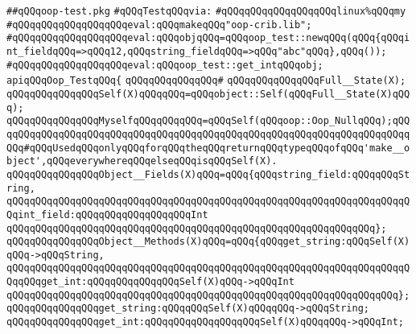 \label{src/app/tut/oop-crib/oop-crib.pkg}
\verb|##qQQqoop-test.pkg|\newline
\newline
\verb|#qQQqTestqQQqvia:|\newline
\verb|#qQQqqQQqqQQqqQQqqQQqlinux%qQQqmy|\newline
\verb|#qQQqqQQqqQQqqQQqqQQqeval:qQQqmakeqQQq"oop-crib.lib";|\newline
\verb|#qQQqqQQqqQQqqQQqqQQqeval:qQQqobjqQQq=qQQqoop_test::newqQQq(qQQq{qQQqint_fieldqQQq=>qQQq12,qQQqstring_fieldqQQq=>qQQq"abc"qQQq},qQQq());|\newline
\verb|#qQQqqQQqqQQqqQQqqQQqeval:qQQqoop_test::get_intqQQqobj;|\newline
\newline
\verb|apiqQQqOop_TestqQQq{|\newline
\verb|qQQqqQQqqQQqqQQq#|\newline
\verb|qQQqqQQqqQQqqQQqFull__State(X);|\newline
\verb|qQQqqQQqqQQqqQQqSelf(X)qQQqqQQq=qQQqobject::Self(qQQqFull__State(X)qQQq);|\newline
\verb|qQQqqQQqqQQqqQQqMyselfqQQqqQQqqQQq=qQQqSelf(qQQqoop::Oop_NullqQQq);qQQqqQQqqQQqqQQqqQQqqQQqqQQqqQQqqQQqqQQqqQQqqQQqqQQqqQQqqQQqqQQqqQQqqQQqqQQq#qQQqUsedqQQqonlyqQQqforqQQqtheqQQqreturnqQQqtypeqQQqofqQQq'make__object',qQQqeverywhereqQQqelseqQQqisqQQqSelf(X).|\newline
\newline
\verb|qQQqqQQqqQQqqQQqObject__Fields(X)qQQq=qQQq{qQQqstring_field:qQQqqQQqString,|\newline
\verb|qQQqqQQqqQQqqQQqqQQqqQQqqQQqqQQqqQQqqQQqqQQqqQQqqQQqqQQqqQQqqQQqqQQqqQQqint_field:qQQqqQQqqQQqqQQqqQQqInt|\newline
\verb|qQQqqQQqqQQqqQQqqQQqqQQqqQQqqQQqqQQqqQQqqQQqqQQqqQQqqQQqqQQqqQQq};|\newline
\newline
\verb|qQQqqQQqqQQqqQQqObject__Methods(X)qQQq=qQQq{qQQqget_string:qQQqSelf(X)qQQq->qQQqString,|\newline
\verb|qQQqqQQqqQQqqQQqqQQqqQQqqQQqqQQqqQQqqQQqqQQqqQQqqQQqqQQqqQQqqQQqqQQqqQQqqQQqget_int:qQQqqQQqqQQqqQQqSelf(X)qQQq->qQQqInt|\newline
\verb|qQQqqQQqqQQqqQQqqQQqqQQqqQQqqQQqqQQqqQQqqQQqqQQqqQQqqQQqqQQqqQQqqQQq};|\newline
\newline
\verb|qQQqqQQqqQQqqQQqget_string:qQQqqQQqSelf(X)qQQqqQQq->qQQqString;|\newline
\verb|qQQqqQQqqQQqqQQqget_int:qQQqqQQqqQQqqQQqqQQqSelf(X)qQQqqQQq->qQQqInt;|\newline
